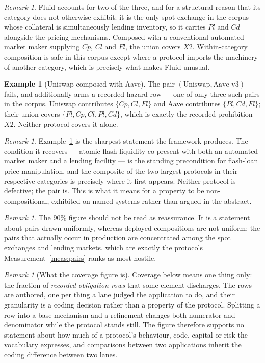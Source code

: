 \documentclass[11pt,reqno]{amsart}
\theoremstyle{plain}
\theoremstyle{definition}
\newtheorem{example}[theorem]{Example}
\theoremstyle{remark}
\newtheorem{remark}[theorem]{Remark}
\begin{document}
\begin{remark}
Fluid accounts for two of the three, and for a structural reason that its
category does not otherwise exhibit: it is the only spot exchange in the corpus
whose collateral is simultaneously lending inventory, so it carries $Pl$ and $Cd$
alongside the pricing mechanisms. Composed with a conventional automated market
maker supplying $Cp$, $Cl$ and $Fl$, the union covers $X2$. Within-category
composition is safe in this corpus except where a protocol imports the machinery
of another category, which is precisely what makes Fluid unusual.
\end{remark}

\begin{example}[Uniswap composed with Aave]\label{ex:uniaave}
The pair $(\text{Uniswap}, \text{Aave~v3})$ fails, and additionally arms a
recorded hazard row --- one of only three such pairs in the corpus. Uniswap
contributes $\{Cp, Cl, Fl\}$ and Aave contributes $\{Pl, Cd, Fl\}$; their union
covers $\{Fl, Cp, Cl, Pl, Cd\}$, which is exactly the recorded prohibition $X2$.
Neither protocol covers it alone.
\end{example}

\begin{remark}
Example~\ref{ex:uniaave} is the sharpest statement the framework produces. The
condition it recovers --- atomic flash liquidity co-present with both an
automated market maker and a lending facility --- is the standing precondition
for flash-loan price manipulation, and the composite of the two largest protocols
in their respective categories is precisely where it first appears. Neither
protocol is defective; the pair is. This is what it means for a property to be
non-compositional, exhibited on named systems rather than argued in the abstract.
\end{remark}

\begin{remark}
The $90\%$ figure should not be read as reassurance. It is a statement about
pairs drawn uniformly, whereas deployed compositions are not uniform: the pairs
that actually occur in production are concentrated among the spot exchanges and
lending markets, which are exactly the protocols
Measurement~\ref{meas:pairs} ranks as most hostile.
\end{remark}

\begin{remark}[What the coverage figure is]\label{rem:coverage}
Coverage below means one thing only: the fraction of \emph{recorded obligation
rows} that some element discharges. The rows are authored, one per thing a lane
judged the application to do, and their granularity is a coding decision rather
than a property of the protocol. Splitting a row into a base mechanism and a
refinement changes both numerator and denominator while the protocol stands
still. The figure therefore supports no statement about how much of a protocol's
behaviour, code, capital or risk the vocabulary expresses, and comparisons
between two applications inherit the coding difference between two lanes.
\end{remark}
\end{document}
